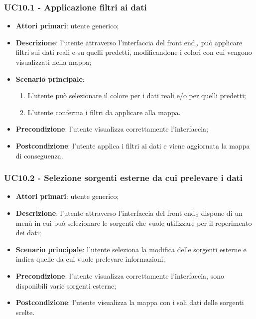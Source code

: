 \subsubsection{UC10.1 - Applicazione filtri ai dati}\label{CasiDUsoCasiDUsoFacoltativiTraUnUtenteEIlFrontEndElencoCasiDUsoUC101ApplicazioneFiltriAiDati}
\begin{itemize}
	\item \textbf{Attori primari}: utente generico;
	\item \textbf{Descrizione}: l'utente attraverso l'interfaccia del front end$_{\scaleto{G}{3pt}}$ può applicare filtri sui dati reali e su quelli predetti, modificandone i colori con cui vengono visualizzati nella mappa;
	\item \textbf{Scenario principale}: 
	\begin{enumerate}
		\item L'utente può selezionare il colore per i dati reali e/o per quelli predetti;
		\item L'utente conferma i filtri da applicare alla mappa. 
	\end{enumerate}
	\item \textbf{Precondizione}: l'utente visualizza correttamente l'interfaccia;
	\item \textbf{Postcondizione}: l'utente applica i filtri ai dati e viene aggiornata la mappa di conseguenza. 
\end{itemize}

\subsubsection{UC10.2 - Selezione sorgenti esterne da cui prelevare i dati}\label{CasiDUsoCasiDUsoFacoltativiTraUnUtenteEIlFrontEndElencoCasiDUsoUC102SelezioneSorgentiEsterneDaCuiPrelevareIDati}
\begin{itemize}
	\item \textbf{Attori primari}: utente generico;
	\item \textbf{Descrizione}: l'utente attraverso l'interfaccia del front end$_{\scaleto{G}{3pt}}$ dispone di un menù in cui può selezionare le sorgenti che vuole utilizzare per il reperimento dei dati;
	\item \textbf{Scenario principale}: l'utente seleziona la modifica delle sorgenti esterne e indica quelle da cui vuole prelevare informazioni;
	\item \textbf{Precondizione}: l'utente visualizza correttamente l'interfaccia, sono disponibili varie sorgenti esterne;
	\item \textbf{Postcondizione}: l'utente visualizza la mappa con i soli dati delle sorgenti scelte. 
\end{itemize}

